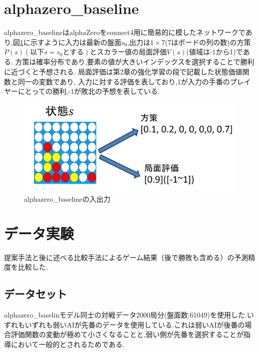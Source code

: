 \section{alphazero\_baseline}
alphazero\_baseline\cite{baseline}はalphaZeroをconnect4用に簡易的に模したネットワークであり,図\ref{fig:baseline}に示すように入力は最新の盤面$s_0$,出力は$1\times7$(7はボードの列の数)の方策$P(s)(以下s=s_0とする)$とスカラー値の局面評価$V(s)$(値域は-1から1)である.
方策は確率分布であり,要素の値が大きいインデックスを選択することで勝利に近づくと予想される.
局面評価は第2章の強化学習の段で記載した状態価値関数と同一の変数であり,
入力に対する評価を表しており,1が入力の手番のプレイヤーにとっての勝利,-1が敗北の予想を表している.

\begin{figure}[t]
    \centering
    \includegraphics[trim={0cm 0cm 0cm 0cm},clip]{./figure/baseline.png}

    \caption{alphazero\_baselineの入出力}
    \label{fig:baseline}
\end{figure}


\section{データ実験}
\label{chap:evaluation}
提案手法と後に述べる比較手法によるゲーム結果（後で勝敗も含める）の予測精度を比較した.
\subsection{データセット}
alphazero\_baselinモデル同士の対戦データ2000局分(盤面数:61049)を使用した.いずれもいずれも弱いAIが先番のデータを使用している.これは弱いAIが後番の場合評価関数の変動が極めて小さくなることと,弱い側が先番を選択することが指導において一般的とされるためである.

